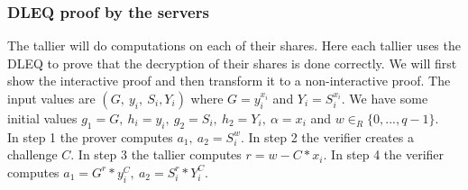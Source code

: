 \subsubsection{DLEQ proof by the servers}
The tallier will do computations on each of their shares. Here each tallier uses the DLEQ to prove that the decryption of their shares is done correctly. We will first show the interactive proof and then transform it to a non-interactive proof. The input values are \begin{math}(G,\ y_i,\ S_i, Y_i)\end{math} where \begin{math}G = y_i^{x_i}\end{math} and  \begin{math} Y_i=S_i^{x_i}\end{math}. We have some initial values
 \begin{math}g_1 =G,\ h_i=y_i,\ g_2=S_i,\ h_2=Y_i,\ \alpha=x_i \end{math} and \begin{math}w \in_R \{0,...,q-1\}\end{math}.\\
 
 
 
\noindent 
In step 1 the prover computes \begin{math}a_1,\ a_2=S_i^w\end{math}. In step 2
the verifier creates a challenge \begin{math}C\end{math}. In step 3 the tallier computes \begin{math}r=w-C*x_i\end{math}. In step 4 the verifier computes \begin{math}a_1=G^r*y_i^C,\ a_2=S_i^r*Y_i^C\end{math}.
 
 
 
